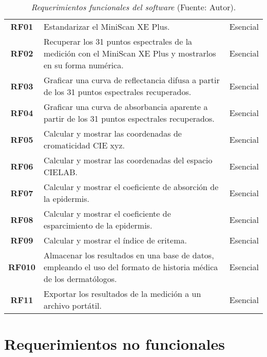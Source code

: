 	\begin{table}[h]
		\small
		\caption[Requerimientos funcionales del software]{\textit{Requerimientos funcionales del software} (Fuente: Autor).}
		\centering
		\setlength{\extrarowheight}{\altocelda}
		\begin{tabulary}{\anchotabla}{|c|J|c|}
			\hline
			 &  & \\ \hline
			
			\textbf{RF01} & Estandarizar el MiniScan XE Plus. & Esencial\\ \hline
			
			\textbf{RF02} & Recuperar los 31 puntos espectrales de la medici\'{o}n con el MiniScan XE Plus y mostrarlos en su forma num\'{e}rica. & Esencial\\ \hline

			\textbf{RF03} & Graficar una curva de reflectancia difusa a partir de los 31 puntos espectrales recuperados. & Esencial\\ \hline
			\textbf{RF04} & Graficar una curva de absorbancia aparente a partir de los 31 puntos espectrales recuperados. & Esencial\\ \hline
			\textbf{RF05} & Calcular y mostrar las coordenadas de cromaticidad CIE xyz. & Esencial\\ \hline
			\textbf{RF06} & Calcular y mostrar las coordenadas del espacio CIELAB. & Esencial\\ \hline
			\textbf{RF07} & Calcular y mostrar el coeficiente de absorci\'{o}n de la epidermis. & Esencial\\ \hline
			\textbf{RF08} & Calcular y mostrar el coeficiente de esparcimiento de la epidermis. & Esencial\\ \hline
			\textbf{RF09} & Calcular y mostrar el \'{i}ndice de eritema. & Esencial\\ \hline
			\textbf{RF010} & Almacenar los resultados en una base de datos, empleando el uso del formato de historia m\'{e}dica de los dermat\'{o}logos. & Esencial\\ \hline
			\textbf{RF11} & Exportar los resultados de la medici\'{o}n a un archivo port\'{a}til. & Esencial\\ \hline
		\end{tabulary}
	\end{table}
	
\section{Requerimientos no funcionales}
	
